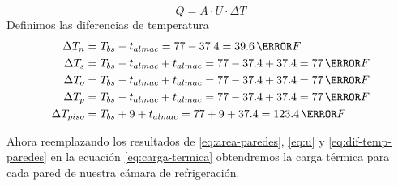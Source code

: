 \begin{equation} 
	Q = A \cdot U \cdot \Delta T
	\label{eq:carga-termica}
\end{equation}
Definimos las diferencias de temperatura
\begin{equation}
	\begin{aligned}		 
		 \Delta T_n & = T_{bs} - t_{almac} = 77 - 37.4 = 39.6 \,  \degree F \\  
		 \Delta T_s & = T_{bs} - t_{almac} + t_{almac} = 77 - 37.4 + 37.4 = 77 \,  \degree F \\  
		 \Delta T_o & = T_{bs} - t_{almac} + t_{almac} = 77 - 37.4 + 37.4 = 77 \,  \degree F \\  
		 \Delta T_p & = T_{bs} - t_{almac} + t_{almac} = 77 - 37.4 + 37.4 = 77 \,  \degree F \\  
		 \Delta T_{piso} & = T_{bs} + 9 + t_{almac} = 77 + 9 + 37.4 = 123.4 \, \degree F
	\end{aligned}
	\label{eq:dif-temp-paredes}
\end{equation}

 
Ahora reemplazando los resultados de \ref{eq:area-paredes}, \ref{eq:u}  y \ref{eq:dif-temp-paredes} en la ecuación \ref{eq:carga-termica} obtendremos la carga térmica para cada pared de nuestra cámara de refrigeración.
  
